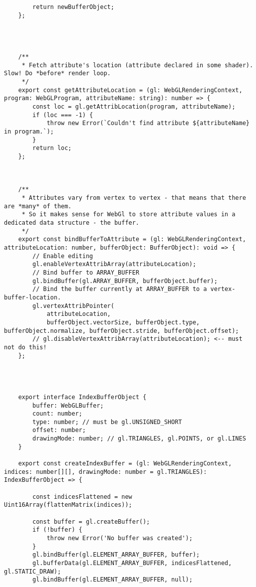 \begin{lstlisting}
        return newBufferObject;
    };
    
    
    
    
    /**
     * Fetch attribute's location (attribute declared in some shader). Slow! Do *before* render loop.
     */
    export const getAttributeLocation = (gl: WebGLRenderingContext, program: WebGLProgram, attributeName: string): number => {
        const loc = gl.getAttribLocation(program, attributeName);
        if (loc === -1) {
            throw new Error(`Couldn't find attribute ${attributeName} in program.`);
        }
        return loc;
    };
    
    
    
    /**
     * Attributes vary from vertex to vertex - that means that there are *many* of them.
     * So it makes sense for WebGl to store attribute values in a dedicated data structure - the buffer.
     */
    export const bindBufferToAttribute = (gl: WebGLRenderingContext, attributeLocation: number, bufferObject: BufferObject): void => {
        // Enable editing
        gl.enableVertexAttribArray(attributeLocation);
        // Bind buffer to ARRAY_BUFFER
        gl.bindBuffer(gl.ARRAY_BUFFER, bufferObject.buffer);
        // Bind the buffer currently at ARRAY_BUFFER to a vertex-buffer-location.
        gl.vertexAttribPointer(
            attributeLocation,
            bufferObject.vectorSize, bufferObject.type, bufferObject.normalize, bufferObject.stride, bufferObject.offset);
        // gl.disableVertexAttribArray(attributeLocation); <-- must not do this!
    };
    
    
    
    
    export interface IndexBufferObject {
        buffer: WebGLBuffer;
        count: number;
        type: number; // must be gl.UNSIGNED_SHORT
        offset: number;
        drawingMode: number; // gl.TRIANGLES, gl.POINTS, or gl.LINES
    }
    
    export const createIndexBuffer = (gl: WebGLRenderingContext, indices: number[][], drawingMode: number = gl.TRIANGLES): IndexBufferObject => {
    
        const indicesFlattened = new Uint16Array(flattenMatrix(indices));
    
        const buffer = gl.createBuffer();
        if (!buffer) {
            throw new Error('No buffer was created');
        }
        gl.bindBuffer(gl.ELEMENT_ARRAY_BUFFER, buffer);
        gl.bufferData(gl.ELEMENT_ARRAY_BUFFER, indicesFlattened, gl.STATIC_DRAW);
        gl.bindBuffer(gl.ELEMENT_ARRAY_BUFFER, null);
    

\end{lstlisting}

